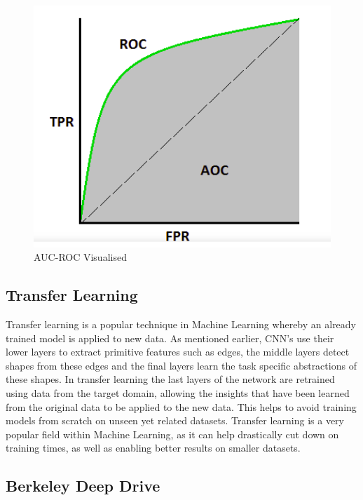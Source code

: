 \documentclass[12pt]{report}
\begin{document}
\vspace{0.5cm}
\begin{figure}[ht!]
	\centering
	\includegraphics[width=12cm]{aucroc}
	\caption{AUC-ROC Visualised}
	\label{fig:aucroc}
\end{figure}

\subsection{Transfer Learning}
\begin{flushleft}
Transfer learning is a popular technique in Machine Learning whereby an already trained model is applied to new data. As mentioned earlier, CNN's use their lower layers to extract primitive features such as edges, the middle layers detect shapes from these edges and the final layers learn the task specific abstractions of these shapes. In transfer learning the last layers of the network are retrained using data from the target domain, allowing the insights that have been learned from the original data to be applied to the new data. This helps to avoid training models from scratch on unseen yet related datasets. Transfer learning is a very popular field within Machine Learning, as it can help drastically cut down on training times, as well as enabling better results on smaller datasets.
\end{flushleft}

\subsection{Berkeley Deep Drive}
\end{document}
